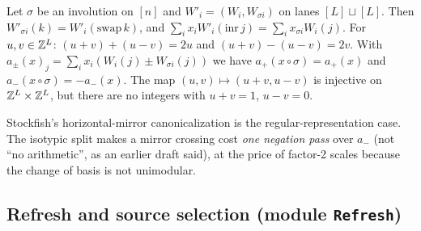 \begin{theorem}\label{thm:t22}
Let $\sigma$ be an involution on $[n]$ and $W'_i=(W_i,W_{\sigma i})$ on lanes $[L]\sqcup[L]$.
Then $W'_{\sigma i}(k)=W'_i(\mathrm{swap}\,k)$, and $\sum_ix_iW'_i(\mathrm{inr}\,j)=\sum_ix_{\sigma i}W_i(j)$.
For $u,v\in\mathbb{Z}^L$: $(u+v)+(u-v)=2u$ and $(u+v)-(u-v)=2v$.
With $a_\pm(x)_j=\sum_ix_i(W_i(j)\pm W_{\sigma i}(j))$ we have $a_+(x\circ\sigma)=a_+(x)$ and $a_-(x\circ\sigma)=-a_-(x)$.
The map $(u,v)\mapsto(u+v,u-v)$ is injective on $\mathbb{Z}^L\times\mathbb{Z}^L$, but there are no integers with $u+v=1$, $u-v=0$.
\end{theorem}
\noindent Stockfish's horizontal-mirror canonicalization is the regular-representation case. The isotypic split makes a mirror crossing cost \emph{one negation pass} over $a_-$ (not ``no arithmetic'', as an earlier draft said), at the price of factor-2 scales because the change of basis is not unimodular.

\subsection{Refresh and source selection (module \texttt{Refresh})}

